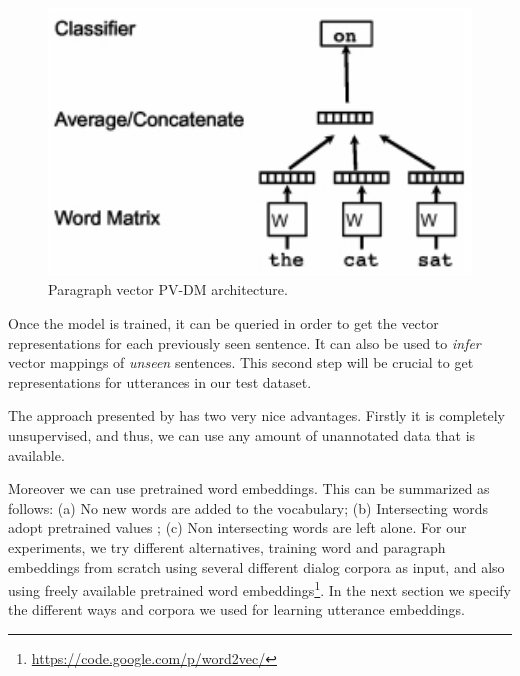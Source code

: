 \begin{figure}
\centering
\begin{minipage}{.3\textwidth}
\includegraphics[width=1\textwidth]{img/par2vec_arq}
\caption{Paragraph vector PV-DM architecture.}
\label{fig:p2v_arq}
\end{minipage}
\end{figure}

Once the model is trained, it can be queried in order to get the vector representations for each previously seen sentence. It can also be used to \emph{infer} vector mappings of \emph{unseen} sentences. This second step will be crucial to get representations for utterances in our test dataset.

The approach presented by  has two very nice advantages. Firstly it is completely unsupervised, and thus, we can use any amount of unannotated data that is available.


Moreover we can use pretrained word embeddings. This can be summarized as follows: (a) No new words are added to the vocabulary; (b) Intersecting words adopt pretrained values ; (c) Non intersecting words are left alone. 
For our experiments, we try different alternatives, training word and paragraph embeddings from scratch using several different dialog corpora as input, and also using freely available pretrained word embeddings\footnote{\url{https://code.google.com/p/word2vec/}}. In the next section we specify the different ways and corpora we used for learning utterance embeddings. 
